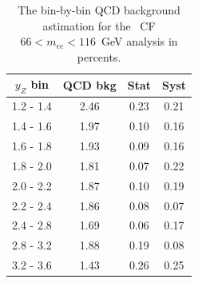 \begin{figure}
\end{figure}

\begin{table}
\centering
\begin{tabular}{ cccc } \hline \hline
 $y_Z$ bin & QCD bkg & Stat & Syst \\  \hline
 1.2 -  1.4 &   2.46 &   0.23  &   0.21 \\
 1.4 -  1.6 &   1.97 &   0.10  &   0.16 \\
 1.6 -  1.8 &   1.93 &   0.09  &   0.16 \\
 1.8 -  2.0 &   1.81 &   0.07  &   0.22 \\
 2.0 -  2.2 &   1.87 &   0.10  &   0.19 \\
 2.2 -  2.4 &   1.86 &   0.08  &   0.07 \\
 2.4 -  2.8 &   1.69 &   0.06  &   0.17 \\
 2.8 -  3.2 &   1.88 &   0.19  &   0.08 \\
 3.2 -  3.6 &   1.43 &   0.26  &   0.25 \\
\hline \hline
\end{tabular}
\caption{The bin-by-bin QCD background astimation for the \Zee\ CF $66 < m_{ee} < 116$~GeV analysis in percents.}
\label{tab:bkg_qcd_peak_percents}
\end{table}

